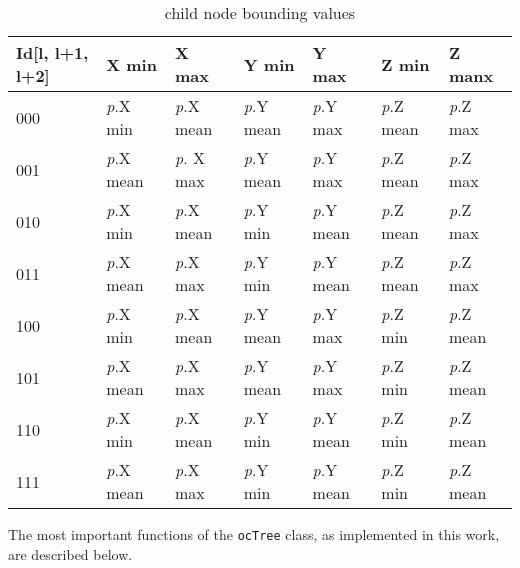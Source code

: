 \begin{table}[]
\begin{tabular}{l|llllll}
Id{[}l, l+1, l+2{]} & X min & X max & Y min & Y max & Z min & Z manx \\ \hline
000 & \textit{p}.X min & \textit{p}.X mean & \textit{p}.Y mean & \textit{p}.Y max & \textit{p}.Z mean & \textit{p}.Z max \\
001 & \textit{p}.X mean & \textit{p}. X max & \textit{p}.Y mean & \textit{p}.Y max & \textit{p}.Z mean & \textit{p}.Z max \\
010 & \textit{p}.X min & \textit{p}.X mean & \textit{p}.Y min & \textit{p}.Y mean & \textit{p}.Z mean & \textit{p}.Z max \\
011 & \textit{p}.X mean & \textit{p}.X max & \textit{p}.Y min & \textit{p}.Y mean & \textit{p}.Z mean & \textit{p}.Z max \\
100 & \textit{p}.X min & \textit{p}.X mean & \textit{p}.Y mean & \textit{p}.Y max & \textit{p}.Z min & \textit{p}.Z mean \\
101 & \textit{p}.X mean & \textit{p}.X max & \textit{p}.Y mean & \textit{p}.Y max & \textit{p}.Z min & \textit{p}.Z mean \\
110 & \textit{p}.X min & \textit{p}.X mean & \textit{p}.Y min & \textit{p}.Y mean & \textit{p}.Z min & \textit{p}.Z mean \\
111 & \textit{p}.X mean & \textit{p}.X max & \textit{p}.Y min & \textit{p}.Y mean & \textit{p}.Z min & \textit{p}.Z mean
\end{tabular}
\caption{child node bounding values}
\end{table}

The most important functions of the \texttt{ocTree} class, as implemented in this work, are described below.

